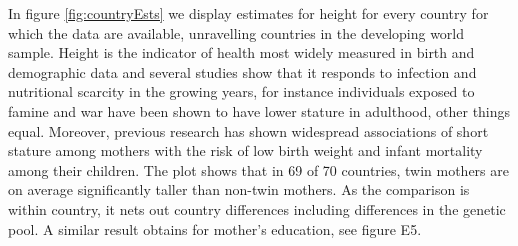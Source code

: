 \documentclass{nature}
\begin{document}
\begin{linenumbers}


In figure \ref{fig:countryEsts} we display estimates for height for every country for which the data are available, unravelling countries in the developing world sample. Height is the indicator of health most widely measured in birth and demographic data and several studies show that it responds to infection and nutritional scarcity in the growing years, for instance individuals exposed to famine and war have been shown to have lower stature in adulthood, other things equal\cite{Silventoinen2003,Bozzolietal2009,Wangetal2010,Akreshetal2012}. Moreover, previous research has shown widespread associations of short stature among mothers with the risk of low birth weight and infant mortality among their children\cite{BhalotraRawlings2013}. The plot shows that in 69 of 70 countries, twin mothers are on average significantly taller than non-twin mothers. As the comparison is within country, it nets out country differences including differences in the genetic pool. A similar result obtains for mother's education\cite{Kenkel1991,CutlerLlerasMuney2010}, see figure E5.


\end{linenumbers}
\end{document}
